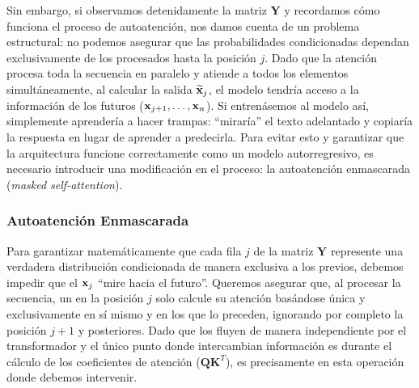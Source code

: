Sin embargo, si observamos detenidamente la matriz $\mathbf{Y}$ y recordamos 
cómo funciona el proceso de autoatención, nos damos cuenta de un problema 
estructural: no podemos asegurar que las probabilidades condicionadas dependan 
exclusivamente de los \tokens{} procesados hasta la posición $j$. 
Dado que la atención procesa toda la secuencia en paralelo y atiende a todos los 
elementos simultáneamente, al calcular la salida $\widetilde{\mathbf{x}}_j$, el modelo 
tendría acceso a la información de los \tokens{} futuros ($\mathbf{x}_{j+1}, \dots, \mathbf{x}_n$).
Si entrenásemos al modelo así, simplemente aprendería a hacer trampas: 
``miraría'' el texto adelantado y copiaría la respuesta en lugar de aprender a 
predecirla.
Para evitar esto y garantizar que la arquitectura funcione correctamente como 
un modelo autorregresivo, es necesario introducir una modificación en el proceso: 
la autoatención enmascarada (\textit{masked self-attention}).


\subsubsection{Autoatención Enmascarada}
Para garantizar matemáticamente que cada fila $j$ de la matriz $\mathbf{Y}$ 
represente una verdadera distribución condicionada de manera exclusiva a los 
\tokens{} previos, debemos impedir que el \token{} $\mathbf{x}_j$ ``mire hacia el futuro''.
Queremos asegurar que, al procesar la secuencia, un \token{} en la posición $j$ 
solo calcule su atención basándose única y exclusivamente en sí mismo y en 
los \tokens{} que lo preceden, ignorando por completo la posición $j+1$ y 
posteriores. Dado que los \tokens{} fluyen de manera independiente por el 
transformador y el único punto donde intercambian información es durante el 
cálculo de los coeficientes de atención ($\mathbf{Q} \mathbf{K}^T$), 
es precisamente en esta operación donde debemos intervenir.

